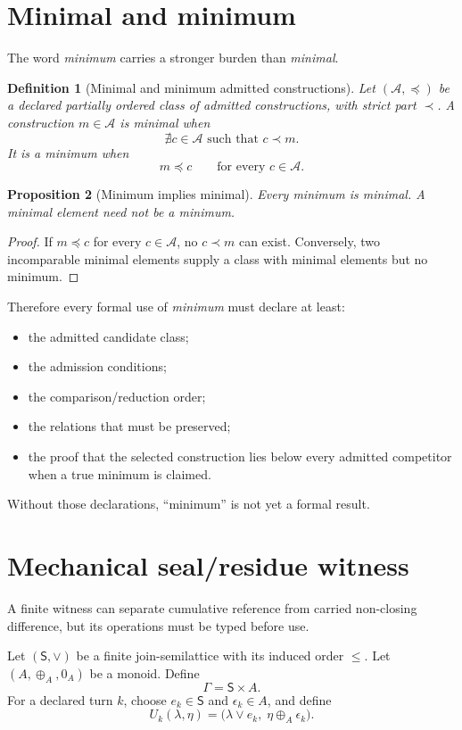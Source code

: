\documentclass[11pt]{article}
\newtheorem{proposition}{Proposition}[section]
\newtheorem{definition}[proposition]{Definition}
\begin{document}
\section{Minimal and minimum}
The word \emph{minimum} carries a stronger burden than \emph{minimal}.

\begin{definition}[Minimal and minimum admitted constructions]
Let \((\mathcal A,\preceq)\) be a declared partially ordered class of admitted constructions, with strict part \(\prec\).
A construction \(m\in\mathcal A\) is \emph{minimal} when
\[
\nexists c\in\mathcal A\text{ such that }c\prec m.
\]
It is a \emph{minimum} when
\[
\boxed{m\preceq c\qquad\text{for every }c\in\mathcal A.}
\]
\end{definition}

\begin{proposition}[Minimum implies minimal]
Every minimum is minimal. A minimal element need not be a minimum.
\end{proposition}
\begin{proof}
If \(m\preceq c\) for every \(c\in\mathcal A\), no \(c\prec m\) can exist. Conversely, two incomparable minimal elements supply a class with minimal elements but no minimum.
\end{proof}

Therefore every formal use of \emph{minimum} must declare at least:
\begin{itemize}
\item the admitted candidate class;
\item the admission conditions;
\item the comparison/reduction order;
\item the relations that must be preserved;
\item the proof that the selected construction lies below every admitted competitor when a true minimum is claimed.
\end{itemize}
Without those declarations, ``minimum'' is not yet a formal result.

\section{Mechanical seal/residue witness}
A finite witness can separate cumulative reference from carried non-closing difference, but its operations must be typed before use.

Let \((\mathsf S,\vee)\) be a finite join-semilattice with its induced order \(\leq\). Let \((A,\oplus_A,0_A)\) be a monoid. Define
\[
\Gamma=\mathsf S\times A.
\]
For a declared turn \(k\), choose \(e_k\in\mathsf S\) and \(\epsilon_k\in A\), and define
\[
U_k(\lambda,\eta)=\bigl(\lambda\vee e_k,\;\eta\oplus_A\epsilon_k\bigr).
\]
\end{document}
